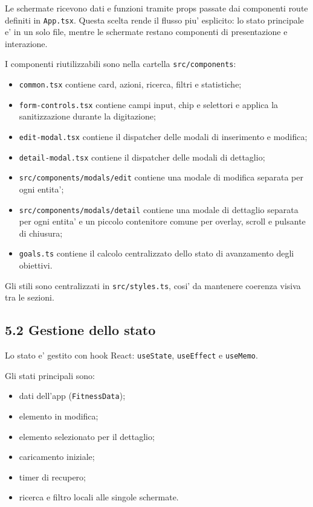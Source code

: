 \documentclass[11pt,a4paper]{article}
\begin{document}
Le schermate ricevono dati e funzioni tramite props passate dai componenti route definiti in \texttt{App.tsx}. Questa scelta rende il flusso piu' esplicito: lo stato principale e' in un solo file, mentre le schermate restano componenti di presentazione e interazione.

I componenti riutilizzabili sono nella cartella \texttt{src/components}:

\begin{itemize}
  \item \texttt{common.tsx} contiene card, azioni, ricerca, filtri e statistiche;
  \item \texttt{form-controls.tsx} contiene campi input, chip e selettori e applica la sanitizzazione durante la digitazione;
  \item \texttt{edit-modal.tsx} contiene il dispatcher delle modali di inserimento e modifica;
  \item \texttt{detail-modal.tsx} contiene il dispatcher delle modali di dettaglio;
  \item \texttt{src/components/modals/edit} contiene una modale di modifica separata per ogni entita';
  \item \texttt{src/components/modals/detail} contiene una modale di dettaglio separata per ogni entita' e un piccolo contenitore comune per overlay, scroll e pulsante di chiusura;
  \item \texttt{goals.ts} contiene il calcolo centralizzato dello stato di avanzamento degli obiettivi.
\end{itemize}

Gli stili sono centralizzati in \texttt{src/styles.ts}, cosi' da mantenere coerenza visiva tra le sezioni.

\subsection{5.2 Gestione dello stato}

Lo stato e' gestito con hook React: \texttt{useState}, \texttt{useEffect} e \texttt{useMemo}.

Gli stati principali sono:

\begin{itemize}
  \item dati dell'app (\texttt{FitnessData});
  \item elemento in modifica;
  \item elemento selezionato per il dettaglio;
  \item caricamento iniziale;
  \item timer di recupero;
  \item ricerca e filtro locali alle singole schermate.
\end{itemize}
\end{document}

